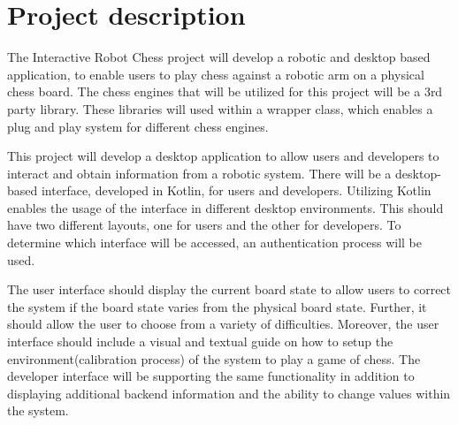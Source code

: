 \documentclass[11pt,fleqn,twoside]{article}
\begin{document}

\mmp

\setcounter{tocdepth}{4} %


\section{Project description}
The Interactive Robot Chess project will develop a robotic and desktop based application, to enable users to 
play chess against a robotic arm on a physical chess board. The chess engines that will be utilized for this project will be a 3rd party library. 
These libraries will used within a wrapper class, which enables a plug and play system for different chess engines.\newline

\noindent This project will develop a desktop application to allow users and developers to interact and obtain 
information from a robotic system. There will be a desktop-based interface, developed in Kotlin\cite{kotlin}, for users 
and developers. Utilizing Kotlin enables the usage of the interface in different desktop environments. 
This should have two different layouts, one for users and the other for developers. To determine which interface will be 
accessed, an authentication process will be used.\newline

\noindent The user interface should display the current board state to allow users to correct the system if the board 
state varies from the physical board state. Further, it should allow the user to choose from a variety of difficulties. 
Moreover, the user interface should include a visual and textual guide on how to setup the environment(calibration process) 
of the system to play a game of chess. The developer interface will be supporting the same functionality in addition to 
displaying additional backend information and the ability to change values within the system.\newline
\end{document}
